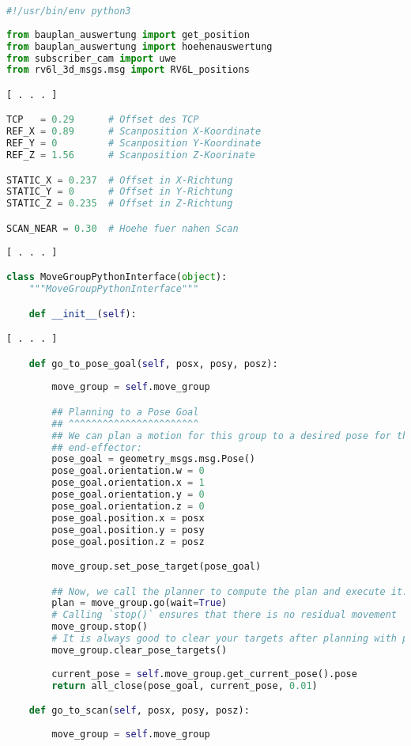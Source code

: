 \begin{lstlisting}[language=python]
#!/usr/bin/env python3
 
from bauplan_auswertung import get_position
from bauplan_auswertung import hoehenauswertung
from subscriber_cam import uwe
from rv6l_3d_msgs.msg import RV6L_positions

[ . . . ]

TCP   = 0.29      # Offset des TCP
REF_X = 0.89      # Scanposition X-Koordinate
REF_Y = 0         # Scanposition Y-Koordinate
REF_Z = 1.56      # Scanposition Z-Koorinate

STATIC_X = 0.237  # Offset in X-Richtung
STATIC_Y = 0      # Offset in Y-Richtung
STATIC_Z = 0.235  # Offset in Z-Richtung

SCAN_NEAR = 0.30  # Hoehe fuer nahen Scan
    
[ . . . ]

class MoveGroupPythonInterface(object):
    """MoveGroupPythonInterface"""

    def __init__(self):

[ . . . ]

    def go_to_pose_goal(self, posx, posy, posz):
        
        move_group = self.move_group

        ## Planning to a Pose Goal
        ## ^^^^^^^^^^^^^^^^^^^^^^^
        ## We can plan a motion for this group to a desired pose for the
        ## end-effector:
        pose_goal = geometry_msgs.msg.Pose()
        pose_goal.orientation.w = 0
        pose_goal.orientation.x = 1
        pose_goal.orientation.y = 0
        pose_goal.orientation.z = 0
        pose_goal.position.x = posx
        pose_goal.position.y = posy
        pose_goal.position.z = posz

        move_group.set_pose_target(pose_goal)

        ## Now, we call the planner to compute the plan and execute it.
        plan = move_group.go(wait=True)
        # Calling `stop()` ensures that there is no residual movement
        move_group.stop()
        # It is always good to clear your targets after planning with poses.
        move_group.clear_pose_targets()
     
        current_pose = self.move_group.get_current_pose().pose
        return all_close(pose_goal, current_pose, 0.01)

    def go_to_scan(self, posx, posy, posz):
        
        move_group = self.move_group


\end{lstlisting}
